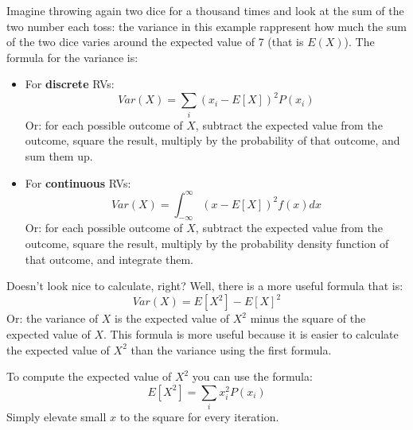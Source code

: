 \documentclass[a4paper]{article}
\newenvironment{remark}{\begin{remarkbox}}{\end{remarkbox}}
\begin{document}
Imagine throwing again two dice for a thousand times and look at the sum of the two number each toss: the variance in this example rappresent how much the sum of the two dice varies around the expected value of 7 (that is $E(X)$). The formula for the variance is:
\begin{itemize}
    \item For \textbf{discrete} RVs:
    $$ Var(X) = \sum_{i} (x_i - E[X])^2P(x_i) $$
    Or: for each possible outcome of $X$, subtract the expected value from the outcome, square the result, multiply by the probability of that outcome, and sum them up.
    \item For \textbf{continuous} RVs:
    $$ Var(X) = \int_{-\infty}^{\infty} (x - E[X])^2f(x)dx $$
    Or: for each possible outcome of $X$, subtract the expected value from the outcome, square the result, multiply by the probability density function of that outcome, and integrate them.

\end{itemize}
Doesn't look nice to calculate, right? Well, there is a more useful formula that is:
$$ Var(X) = E[X^2] - E[X]^2 $$
Or: the variance of $X$ is the expected value of $X^2$ minus the square of the expected value of $X$. This formula is more useful because it is easier to calculate the expected value of $X^2$ than the variance using the first formula.

\begin{remark}
To compute the expected value of $X^2$ you can use the formula: 
$$ E[X^2] = \sum_{i} x_i^2P(x_i) $$
Simply elevate small $x$ to the square for every iteration.
\end{remark}
\end{document}
